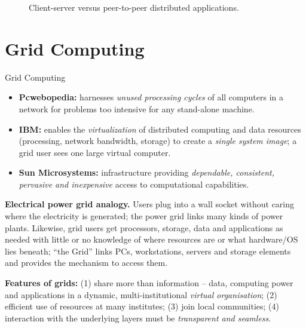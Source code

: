 \documentclass[11pt,a4paper,openany]{report}
\begin{document}
\begin{figure}[H]
\centering
{}
\caption{Client-server versus peer-to-peer distributed applications.}
\end{figure}

\section{Grid Computing}
\begin{defbox}{Grid Computing}
\begin{itemize}[leftmargin=*]
  \item \textbf{Pcwebopedia:} harnesses \emph{unused processing cycles} of all computers in a
        network for problems too intensive for any stand-alone machine.
  \item \textbf{IBM:} enables the \emph{virtualization} of distributed computing and data
        resources (processing, network bandwidth, storage) to create a \emph{single system
        image}; a grid user sees one large virtual computer.
  \item \textbf{Sun Microsystems:} infrastructure providing \emph{dependable, consistent,
        pervasive and inexpensive} access to computational capabilities.
\end{itemize}
\end{defbox}

\textbf{Electrical power grid analogy.} Users plug into a wall socket without caring where the
electricity is generated; the power grid links many kinds of power plants. Likewise, grid users
get processors, storage, data and applications as needed with little or no knowledge of where
resources are or what hardware/OS lies beneath; ``the Grid'' links PCs, workstations, servers and
storage elements and provides the mechanism to access them.

\textbf{Features of grids:} (1) share more than information -- data, computing power and
applications in a dynamic, multi-institutional \emph{virtual organisation}; (2) efficient use of
resources at many institutes; (3) join local communities; (4) interaction with the underlying
layers must be \emph{transparent and seamless}.
\end{document}
